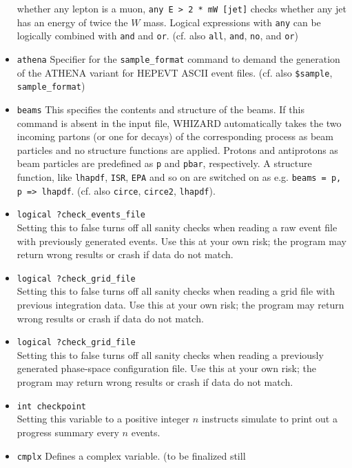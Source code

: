 \documentclass[12pt]{book}
\newcommand{\ttt}[1]{\texttt{#1}}
\begin{document}
\begin{itemize}
whether any lepton is a muon, \ttt{any E > 2 * mW [jet]} checks
whether any jet has an energy of twice the $W$ mass. Logical
expressions with \ttt{any} can be logically combined with \ttt{and}
and \ttt{or}. (cf. also \ttt{all}, \ttt{and}, \ttt{no}, and \ttt{or})
\item
\ttt{athena} \newline 
Specifier for the \ttt{sample\_format} command to demand the
generation of the ATHENA variant for HEPEVT ASCII event
files. (cf. also \ttt{\$sample}, 
\ttt{sample\_format}) 
\item
\ttt{beams} \newline
This specifies the contents and structure of the beams. If this
command is absent in the input file, WHIZARD automatically takes the
two incoming partons (or one for decays) of the corresponding process
as beam particles and no structure functions are applied. Protons and
antiprotons as beam particles are predefined as \ttt{p} and
\ttt{pbar}, respectively. A structure function, like \ttt{lhapdf},
\ttt{ISR}, \ttt{EPA} and so on are switched on as e.g. \ttt{beams = p,
p => lhapdf}. (cf. also \ttt{circe}, \ttt{circe2}, \ttt{lhapdf}).
\item
\ttt{logical ?check\_events\_file}\\
Setting this to false turns off all sanity checks when reading a raw
event file with previously generated events.  Use this at your own
risk; the program may return wrong results or crash if data do not match.
\item
\ttt{logical ?check\_grid\_file}\\
Setting this to false turns off all sanity checks when reading a grid
file with previous integration data.  Use this at your own risk; the
program may return wrong results or crash if data do not match. 
\item
\ttt{logical ?check\_grid\_file}\\
Setting this to false turns off all sanity checks when reading a
previously generated phase-space configuration file.  Use this at your
own risk; the program may return wrong results or crash if data do not
match.
\item
\ttt{int checkpoint}\\
Setting this variable to a positive integer $n$ instructs simulate to
print out a progress summary every $n$ events.
\item
\ttt{cmplx} \newline
{\color{red} Defines a complex variable. (to be finalized still}

\end{itemize}
\end{document}
